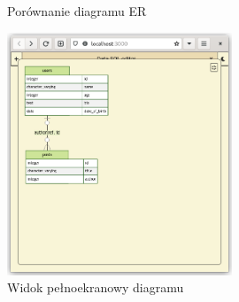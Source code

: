 \begin{figure}
    \centering
    \qquad

    \caption{Porównanie diagramu ER}
    \label{diagramBeforeAfterFigure}
\end{figure}

\begin{figure}[h]
    \centering
    \includegraphics[width=0.6\textwidth]{./img/diagram_diff_after_fullscreen.png}
    \caption{Widok pełnoekranowy diagramu}
    \label{diagramFullscreenFigure}
\end{figure}
